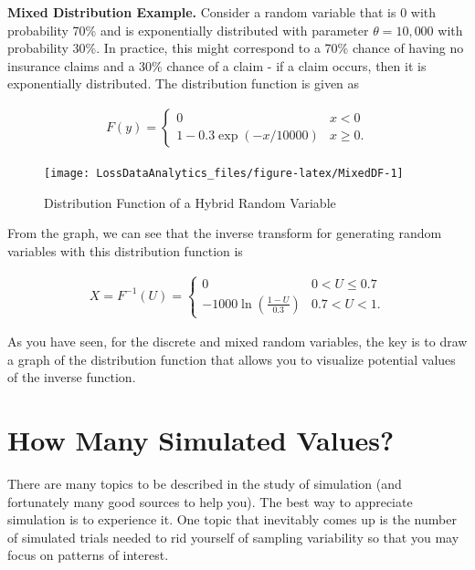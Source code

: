 \documentclass[]{book}
\begin{document}
\textbf{Mixed Distribution Example.} Consider a random variable that is
0 with probability 70\% and is exponentially distributed with parameter
\(\theta= 10,000\) with probability 30\%. In practice, this might
correspond to a 70\% chance of having no insurance claims and a 30\%
chance of a claim - if a claim occurs, then it is exponentially
distributed. The distribution function is given as

\[\begin{aligned}
F(y) = \left\{ \begin{array}{cc}
              0 &  x<0  \\
              1 - 0.3 \exp(-x/10000) & x \ge 0 .
            \end{array} \right.\end{aligned}\]

\begin{figure}

{\centering \texttt{[image: LossDataAnalytics\_files/figure-latex/MixedDF-1]} 

}

\caption{Distribution Function of a Hybrid Random Variable}\label{fig:MixedDF}
\end{figure}

From the graph, we can see that the inverse transform for generating
random variables with this distribution function is

\[\begin{aligned}
X = F^{-1}(U) = \left\{ \begin{array}{cc}
              0 &  0< U  \leq  0.7  \\
              -1000 \ln (\frac{1-U}{0.3}) & 0.7 < U < 1 .
            \end{array} \right.\end{aligned}\]

As you have seen, for the discrete and mixed random variables, the key
is to draw a graph of the distribution function that allows you to
visualize potential values of the inverse function.

\section{How Many Simulated Values?}\label{how-many-simulated-values}

There are many topics to be described in the study of simulation (and
fortunately many good sources to help you). The best way to appreciate
simulation is to experience it. One topic that inevitably comes up is
the number of simulated trials needed to rid yourself of sampling
variability so that you may focus on patterns of interest.
\end{document}
